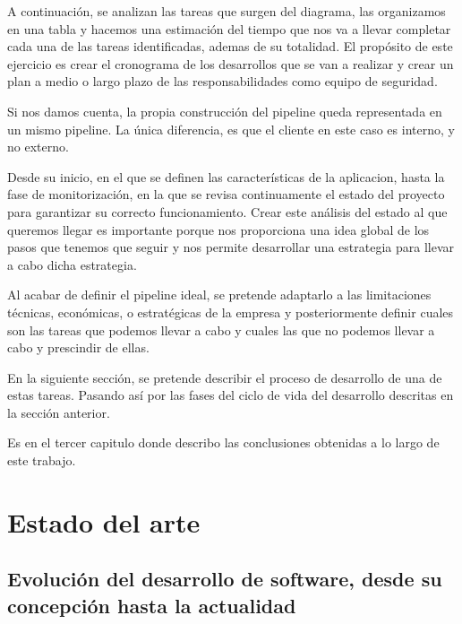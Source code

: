 \documentclass[12pt]{report} %
\begin{document}
A continuación, se analizan las tareas que surgen del diagrama, las organizamos
en una tabla y hacemos una estimación del tiempo que nos va a llevar completar
cada una de las tareas identificadas, ademas de su totalidad.
El propósito de este ejercicio es crear el cronograma de los desarrollos que se
van a realizar y crear un plan a medio o largo plazo de las responsabilidades
como equipo de seguridad.


Si nos damos cuenta, la propia construcción del pipeline queda representada en
un mismo pipeline.
La única diferencia, es que el cliente en este caso es interno, y no externo.

Desde su inicio, en el que se definen las características de la aplicacion,
hasta la fase de monitorización, en la que se revisa continuamente el estado 
del proyecto para garantizar su correcto funcionamiento.
Crear este análisis del estado al que queremos llegar es importante porque nos
proporciona una idea global de los pasos que tenemos que seguir y nos permite
desarrollar una estrategia para llevar a cabo dicha estrategia.

Al acabar de definir el \gls{pipeline} ideal, se pretende adaptarlo a las
limitaciones técnicas, económicas, o estratégicas de la empresa y 
posteriormente definir cuales son las tareas que podemos llevar a cabo y cuales
las que no podemos llevar a cabo y prescindir de ellas.

En la siguiente sección, se pretende describir el proceso de desarrollo de una
de estas tareas.
Pasando así por las fases del ciclo de vida del desarrollo descritas en la sección anterior.

Es en el tercer capitulo donde describo las conclusiones obtenidas a lo largo 
de este trabajo.


\chapter{Estado del arte}

\section{Evolución del desarrollo de software, desde su concepción hasta la
actualidad}
\end{document}
